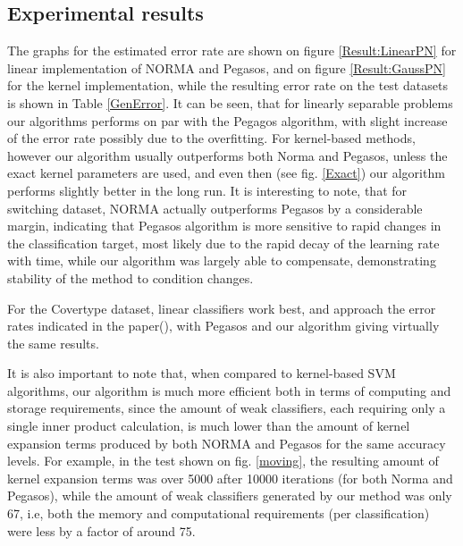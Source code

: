 \subsection{Experimental results}
The graphs for the estimated error rate are shown on figure \ref{Result:LinearPN} for linear implementation of NORMA and Pegasos, and on figure \ref{Result:GaussPN} for the kernel implementation, while the resulting error rate on the test datasets is shown in Table \ref{GenError}.
It can be  seen, that for linearly separable problems our algorithms performs on par with the Pegagos algorithm, with slight increase of the error rate possibly due to the overfitting. For kernel-based methods, however our algorithm usually outperforms both Norma and Pegasos, unless the exact kernel parameters are used, and even then (see fig. \ref{Exact}) our algorithm performs slightly better in the long run. It is interesting to note, that for switching dataset, NORMA actually outperforms Pegasos by a considerable margin, indicating that Pegasos algorithm is more sensitive to rapid changes in the classification target, most likely due to the rapid decay of the learning rate with time, while our algorithm was largely able to compensate, demonstrating stability of the method to condition changes. 

For the Covertype dataset, linear classifiers work best, and approach the error rates indicated in the paper(\cite{Forest}), with Pegasos and our algorithm giving virtually the same results. 

It is also important to note that, when compared to kernel-based SVM algorithms, our algorithm is much more efficient both in terms of computing and storage requirements, since the amount of weak classifiers, each requiring only a single inner product calculation, is much lower than the amount of kernel expansion terms produced by both NORMA and Pegasos for the same accuracy levels. For example, in the test shown on fig. \ref{moving},  the resulting amount of kernel expansion terms was over 5000 after 10000 iterations (for both Norma and Pegasos), while the amount of weak classifiers generated by our method was only 67, i.e, both the memory and computational requirements (per classification) were less by a factor of around 75. 

